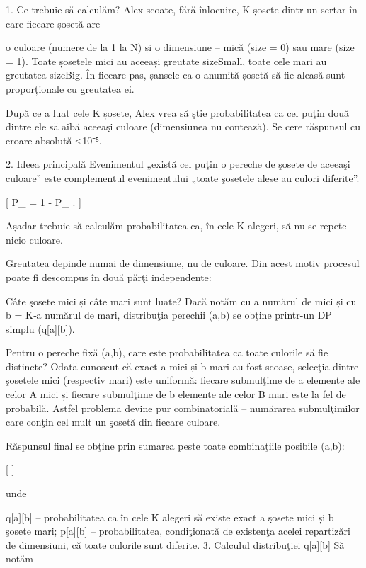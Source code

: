 1. Ce trebuie să calculăm?
Alex scoate, fără înlocuire, K șosete dintr-un sertar în care fiecare șosetă are

o culoare (numere de la 1 la N) și
o dimensiune – mică (size = 0) sau mare (size = 1).
Toate șosetele mici au aceeași greutate sizeSmall, toate cele mari au greutatea sizeBig.
În fiecare pas, șansele ca o anumită șosetă să fie aleasă sunt proporționale cu greutatea ei.

După ce a luat cele K șosete, Alex vrea să ştie probabilitatea ca cel puţin două dintre ele să aibă aceeaşi culoare (dimensiunea nu contează).
Se cere răspunsul cu eroare absolută ≤ 10⁻⁵.

2. Ideea principală
Evenimentul „există cel puţin o pereche de şosete de aceeaşi culoare” este complementul evenimentului „toate şosetele alese au culori diferite”.

[ P_{} = 1 - P_{} . ]

Așadar trebuie să calculăm probabilitatea ca, în cele K alegeri, să nu se repete nicio culoare.

Greutatea depinde numai de dimensiune, nu de culoare. Din acest motiv procesul poate fi descompus în două părţi independente:

Câte şosete mici și câte mari sunt luate?
Dacă notăm cu a numărul de mici și cu b = K‑a numărul de mari, distribuţia perechii (a,b) se obţine printr-un DP simplu (q[a][b]).

Pentru o pereche fixă (a,b), care este probabilitatea ca toate culorile să fie distincte?
Odată cunoscut că exact a mici și b mari au fost scoase, selecţia dintre şosetele mici (respectiv mari) este uniformă: fiecare submulţime de a elemente ale celor A mici și fiecare submulţime de b elemente ale celor B mari este la fel de probabilă. Astfel problema devine pur combinatorială – numărarea submulţimilor care conţin cel mult un şosetă din fiecare culoare.

Răspunsul final se obţine prin sumarea peste toate combinaţiile posibile (a,b):

[  ]

unde

q[a][b] – probabilitatea ca în cele K alegeri să existe exact a şosete mici și b şosete mari;
p[a][b] – probabilitatea, condiţionată de existenţa acelei repartizări de dimensiuni, că toate culorile sunt diferite.
3. Calculul distribuţiei q[a][b]
Să notăm

